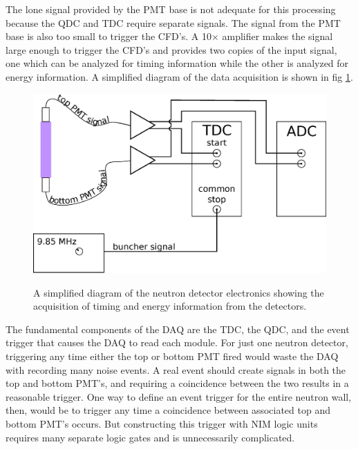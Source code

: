 The lone signal provided by the PMT base is not adequate for this processing because the QDC and TDC require separate signals.  The signal from the PMT base is also too small to trigger the CFD's.  A 10$\times$ amplifier makes the signal large enough to trigger the CFD's and provides two copies of the input signal, one which can be analyzed for timing information while the other is analyzed for energy information.  A simplified diagram of the data acquisition is shown in fig \ref{fig:simpleElectronics}.

\begin{figure}[htp]
\centering
\includegraphics[width=1.0\textwidth]{figures/basic_electronics.eps}
\label{fig:simpleElectronics}
\caption{A simplified diagram of the neutron detector electronics showing the acquisition of timing and energy information from the detectors.}
\end{figure}

The fundamental components of the DAQ are the TDC, the QDC, and the event trigger that causes the DAQ to read each module.  For just one neutron detector, triggering any time either the top or bottom PMT fired would waste the DAQ with recording many noise events.  A real event should create signals in both the top and bottom PMT's, and requiring a coincidence between the two results in a reasonable trigger.  One way to define an event trigger for the entire neutron wall, then, would be to trigger any time a coincidence between associated top and bottom PMT's occurs.  But constructing this trigger with NIM logic units requires many separate logic gates and is unnecessarily complicated.  

